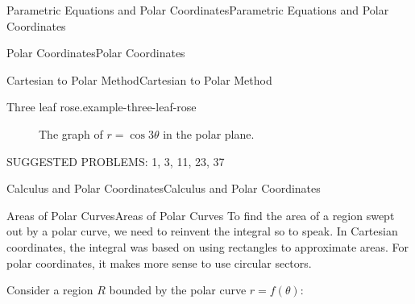 \documentclass[10pt,]{book}
\numberwithin{equation}{section}
\begin{document}
\begin{chapterptx}{Parametric Equations and Polar Coordinates}{}{Parametric Equations and Polar Coordinates}{}{}
\begin{sectionptx}{Polar Coordinates}{}{Polar Coordinates}{}{}
\begin{subsectionptx}{Cartesian to Polar Method}{}{Cartesian to Polar Method}{}{}
\begin{example}{Three leaf rose.}{example-three-leaf-rose}
\begin{figure}
{
}
\caption{The graph of \(r=\cos3\theta\) in the polar plane.\label{figure-cosine-cartesian-3}}
\end{figure}
\end{example}
\hypertarget{p-820}{}%
SUGGESTED PROBLEMS: 1, 3, 11, 23, 37%
\end{subsectionptx}
\end{sectionptx}
%
%
\typeout{************************************************}
\typeout{************************************************}
%
\begin{sectionptx}{Calculus and Polar Coordinates}{}{Calculus and Polar Coordinates}{}{}\label{section-calculus-and-polar-coordinates}
%
%
\typeout{************************************************}
\typeout{************************************************}
%
\begin{subsectionptx}{Areas of Polar Curves}{}{Areas of Polar Curves}{}{}\label{subsection-areas-of-polar-curves}
\hypertarget{p-821}{}%
To find the area of a region swept out by a polar curve, we need to reinvent the integral so to speak. In Cartesian coordinates, the integral was based on using rectangles to approximate areas. For polar coordinates, it makes more sense to use circular sectors.%
\par
\hypertarget{p-822}{}%
Consider a region \(R\) bounded by the polar curve \(r = f(\theta)\):%
\begin{figure}
\centering
{
}
\end{figure}
\end{subsectionptx}
\end{sectionptx}
\end{chapterptx}
\end{document}
